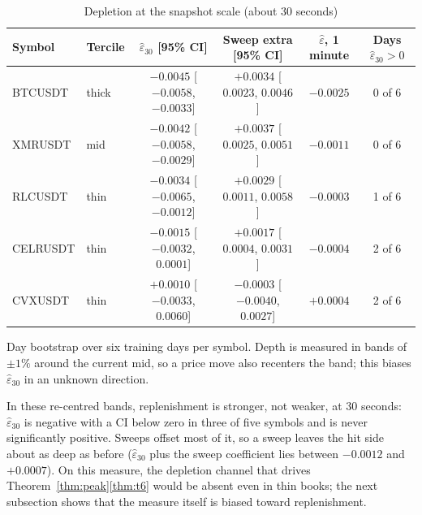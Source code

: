 \documentclass[12pt]{article}
\theoremstyle{definition}
\theoremstyle{remark}
\begin{document}
\begin{table}[t]\centering\small
\begin{threeparttable}
\caption{Depletion at the snapshot scale (about 30 seconds)}\label{tab:x8}
\setlength{\tabcolsep}{2.5pt}
\begin{tabular}{llcccc}
\toprule
Symbol & Tercile & $\hat\varepsilon_{30}$ [95\% CI] & Sweep extra [95\% CI] & $\hat\varepsilon$, 1 minute & Days $\hat\varepsilon_{30}>0$\\
\midrule
BTCUSDT & thick & $-0.0045$ [$-0.0058$, $-0.0033$] & $+0.0034$ [$0.0023$, $0.0046$] & $-0.0025$ & 0 of 6\\
XMRUSDT & mid & $-0.0042$ [$-0.0058$, $-0.0029$] & $+0.0037$ [$0.0025$, $0.0051$] & $-0.0011$ & 0 of 6\\
RLCUSDT & thin & $-0.0034$ [$-0.0065$, $-0.0012$] & $+0.0029$ [$0.0011$, $0.0058$] & $-0.0003$ & 1 of 6\\
CELRUSDT & thin & $-0.0015$ [$-0.0032$, $0.0001$] & $+0.0017$ [$0.0004$, $0.0031$] & $-0.0004$ & 2 of 6\\
CVXUSDT & thin & $+0.0010$ [$-0.0033$, $0.0060$] & $-0.0003$ [$-0.0040$, $0.0027$] & $+0.0004$ & 2 of 6\\
\bottomrule
\end{tabular}
\begin{tablenotes}\footnotesize\item Day bootstrap over six training days per symbol. Depth is measured in bands of $\pm1\%$ around the current mid, so a price move also recenters the band; this biases $\hat\varepsilon_{30}$ in an unknown direction. \end{tablenotes}
\end{threeparttable}
\end{table}

In these re-centred bands, replenishment is stronger, not weaker, at 30 seconds: $\hat\varepsilon_{30}$ is negative with a CI below zero in three of five symbols and is never significantly positive. Sweeps offset most of it, so a sweep leaves the hit side about as deep as before ($\hat\varepsilon_{30}$ plus the sweep coefficient lies between $-0.0012$ and $+0.0007$). On this measure, the depletion channel that drives Theorem~\ref{thm:peak}\ref{thm:t6} would be absent even in thin books; the next subsection shows that the measure itself is biased toward replenishment.
\end{document}
